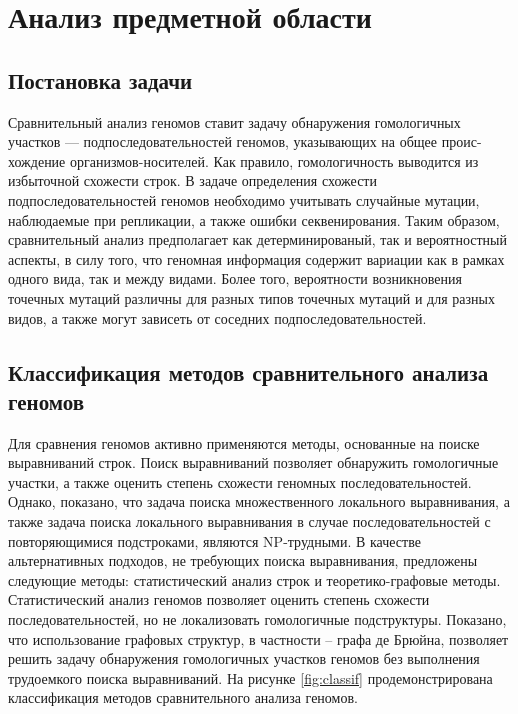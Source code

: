 \section{Анализ предметной области}

\subsection{Постановка задачи}

Сравнительный анализ геномов ставит задачу обнаружения гомологичных участков --- подпоследовательностей геномов, указывающих на общее проис-хождение\cite{1_hardison2003comparative} организмов-носителей. Как правило, гомологичность выводится из избыточной схожести строк\cite{2_pearson2013introduction}. В задаче определения схожести подпоследовательностей геномов необходимо учитывать случайные мутации, наблюдаемые при репликации, а также ошибки секвенирования. Таким образом, сравнительный анализ предполагает как детерминированый, так и вероятностный аспекты, в силу того, что геномная информация содержит вариации как в рамках одного вида\cite{3_barrick2009genome,4_barnetson2008classification}, так и между видами. Более того, вероятности возникновения точечных мутаций различны для разных типов точечных мутаций\cite{5_zhu2017statistical} и для разных видов\cite{5_zhu2017statistical}, а также могут зависеть от соседних подпоследовательностей\cite{5_zhu2017statistical}.

\subsection{Классификация методов сравнительного анализа геномов}

Для сравнения геномов активно применяются методы, основанные на поиске выравниваний строк\cite{6_altschul1990basic,7_altschul1997gapped,8_thompson1994clustal}. Поиск выравниваний позволяет обнаружить гомологичные участки, а также оценить степень схожести геномных последовательностей. Однако, показано, что задача поиска множественного локального выравнивания, а также задача поиска локального выравнивания в случае последовательностей с повторяющимися подстроками, являются NP-трудными\cite{9_perrey1996fast}. В качестве альтернативных подходов, не требующих поиска выравнивания, предложены следующие методы: статистический анализ строк\cite{10_sarkar2021determination,11_bernard2018k} и теоретико-графовые методы\cite{12_aguero2020graph,13_minkin2017twopaco}. Статистический анализ геномов позволяет оценить степень схожести последовательностей, но не локализовать гомологичные подструктуры. Показано, что использование графовых структур, в частности – графа де Брюйна\cite{13_minkin2017twopaco}, позволяет решить задачу обнаружения гомологичных участков геномов без выполнения трудоемкого поиска выравниваний. На рисунке \ref{fig:classif} продемонстрирована классификация методов сравнительного анализа геномов.

